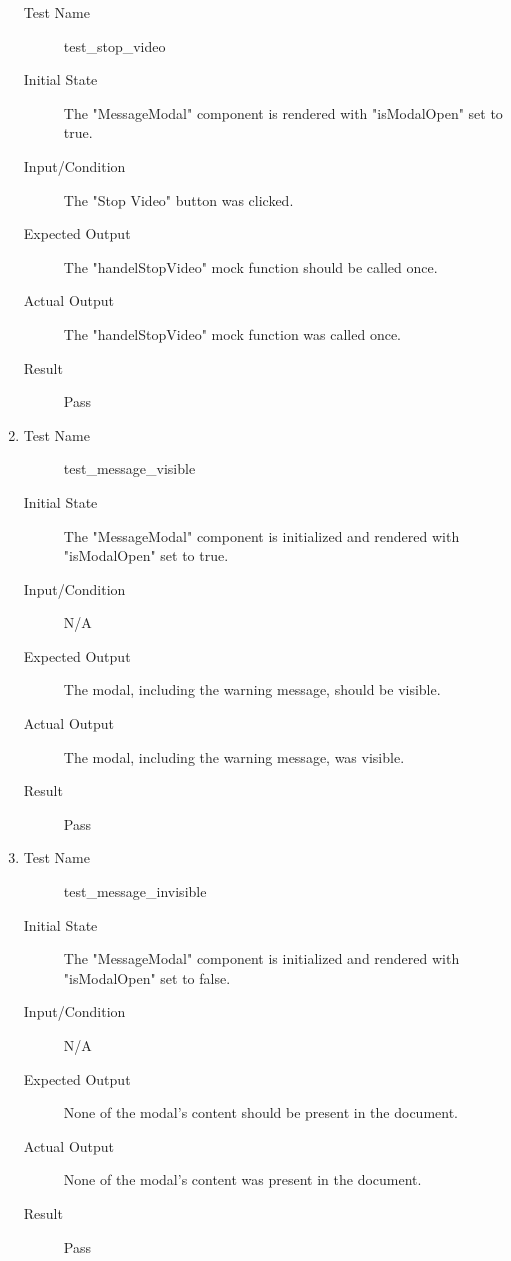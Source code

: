 \documentclass[12pt, titlepage]{article}
\begin{document}
\begin{enumerate}[UT-OT1]
    \begin{description}
    \item[Test Name] test\_stop\_video
    \item[Initial State] The "MessageModal" component is rendered with "isModalOpen" set to true.
    \item[Input/Condition] The "Stop Video" button was clicked.
    \item[Expected Output] The "handelStopVideo" mock function should be called once.
    \item[Actual Output] The "handelStopVideo" mock function was called once.
    \item[Result] Pass
    \end{description}
  \item \label{UT-OT5}
    \begin{description}
    \item[Test Name] test\_message\_visible
    \item[Initial State] The "MessageModal" component is initialized and rendered with "isModalOpen" set to true.
    \item[Input/Condition] N/A
    \item[Expected Output] The modal, including the warning message, should be visible.
    \item[Actual Output] The modal, including the warning message, was visible.
    \item[Result] Pass
    \end{description}
  \item \label{UT-OT6}
    \begin{description}
    \item[Test Name] test\_message\_invisible
    \item[Initial State] The "MessageModal" component is initialized and rendered with "isModalOpen" set to false.
    \item[Input/Condition] N/A
    \item[Expected Output] None of the modal's content should be present in the document.
    \item[Actual Output] None of the modal's content was present in the document.
    \item[Result] Pass
    \end{description}
\end{enumerate}
\end{document}
